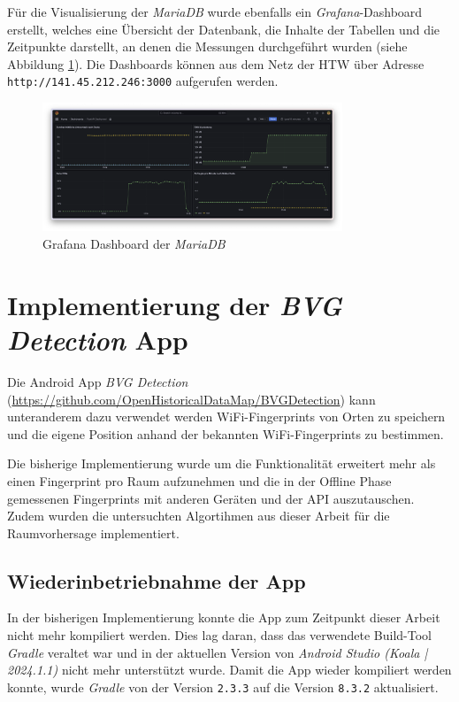 Für die Visualisierung der \textit{MariaDB} wurde ebenfalls ein \textit{Grafana}-Dashboard erstellt, welches eine Übersicht der Datenbank, die Inhalte der Tabellen und die Zeitpunkte darstellt, an denen die Messungen durchgeführt wurden (siehe Abbildung \ref{fig:grafana_maria_db_screenshot}). Die Dashboards können aus dem Netz der HTW über Adresse \texttt{http://141.45.212.246:3000} aufgerufen werden.

\begin{figure}[h]
    \centering
    \includegraphics[width=0.8\textwidth]{images/grafana_maria_db_screenshot.png}
    \caption{Grafana Dashboard der \textit{MariaDB}}
    \label{fig:grafana_maria_db_screenshot}
\end{figure}

\section{Implementierung der \textit{BVG Detection} App}

Die Android App \textit{BVG Detection} (\url{https://github.com/OpenHistoricalDataMap/BVGDetection}) kann unteranderem dazu verwendet werden WiFi-Fingerprints von Orten zu speichern und die eigene Position anhand der bekannten WiFi-Fingerprints zu bestimmen. 

Die bisherige Implementierung wurde um die Funktionalität erweitert mehr als einen Fingerprint pro Raum aufzunehmen und die in der Offline Phase gemessenen Fingerprints mit anderen Geräten und der API auszutauschen. Zudem wurden die untersuchten Algortihmen aus dieser Arbeit für die Raumvorhersage implementiert.

\subsection{Wiederinbetriebnahme der App}

In der bisherigen Implementierung konnte die App zum Zeitpunkt dieser Arbeit nicht mehr kompiliert werden. Dies lag daran, dass das verwendete Build-Tool \textit{Gradle} veraltet war und in der aktuellen Version von \textit{Android Studio (Koala | 2024.1.1)} nicht mehr unterstützt wurde. Damit die App wieder kompiliert werden konnte, wurde \textit{Gradle} von der Version \texttt{2.3.3} auf die Version \texttt{8.3.2} aktualisiert. %

